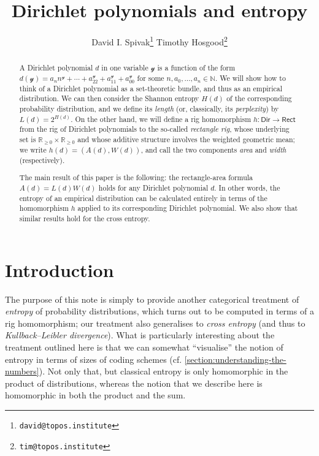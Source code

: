 \documentclass[11pt,fleqn]{article}
\title{Dirichlet polynomials and entropy}
\author{David I. Spivak\footnote{\texttt{david@topos.institute}} \qquad Timothy Hosgood\footnote{\texttt{tim@topos.institute}}}
\renewcommand{\geq}{\geqslant}
\newcommand{\yon}{\mathcal{y}}
\newcommand{\rig}[1]{\mathsf{#1}}
\newcommand{\Dir}{\rig{Dir}}
\newcommand{\Rect}{\rig{Rect}}
\begin{document}
\maketitle

\begin{abstract}
  A Dirichlet polynomial $d$ in one variable $\yon$ is a function of the form $d(\yon)=a_n n^\yon+\cdots+a_22^\yon+a_11^\yon+a_00^\yon$ for some $n,a_0,\ldots,a_n\in\mathbb{N}$.
  We will show how to think of a Dirichlet polynomial as a set-theoretic bundle, and thus as an empirical distribution.
  We can then consider the Shannon entropy $H(d)$ of the corresponding probability distribution, and we define its \emph{length} (or, classically, its \emph{perplexity}) by $L(d)=2^{H(d)}$.
  On the other hand, we will define a rig homomorphism $h\colon\Dir\to\Rect$ from the rig of Dirichlet polynomials to the so-called \emph{rectangle rig}, whose underlying set is $\mathbb{R}_{\geq0}\times\mathbb{R}_{\geq0}$ and whose additive structure involves the weighted geometric mean;
  we write $h(d)=(A(d),W(d))$, and call the two components \emph{area} and \emph{width} (respectively).

  The main result of this paper is the following: the rectangle-area formula $A(d)=L(d)W(d)$ holds for any Dirichlet polynomial $d$.
  In other words, the entropy of an empirical distribution can be calculated entirely in terms of the homomorphism $h$ applied to its corresponding Dirichlet polynomial.
  We also show that similar results hold for the cross entropy.
\end{abstract}



\section{Introduction}
\label{section:introduction}

The purpose of this note is simply to provide another categorical treatment of \emph{entropy} of probability distributions, which turns out to be computed in terms of a rig homomorphism;
our treatment also generalises to \emph{cross entropy} (and thus to \emph{Kullback--Leibler divergence}).
What is particularly interesting about the treatment outlined here is that we can somewhat ``visualise'' the notion of entropy in terms of sizes of coding schemes (cf. \cref{section:understanding-the-numbers}).
Not only that, but classical entropy is only homomorphic in the product of distributions, whereas the notion that we describe here is homomorphic in both the product and the sum.
\end{document}
